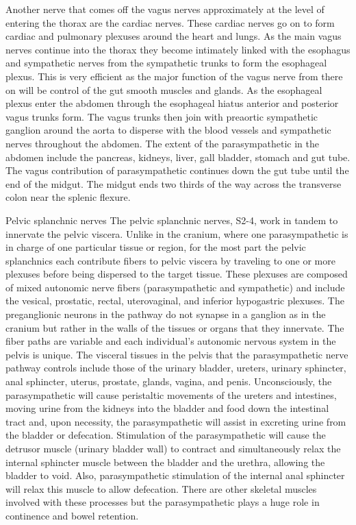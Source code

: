 \documentclass[]{book}
\begin{document}
Another nerve that comes off the vagus nerves approximately at the level of entering the thorax are the cardiac nerves. These cardiac nerves go on to form cardiac and pulmonary plexuses around the heart and lungs. As the main vagus nerves continue into the thorax they become intimately linked with the esophagus and sympathetic nerves from the sympathetic trunks to form the esophageal plexus. This is very efficient as the major function of the vagus nerve from there on will be control of the gut smooth muscles and glands. As the esophageal plexus enter the abdomen through the esophageal hiatus anterior and posterior vagus trunks form. The vagus trunks then join with preaortic sympathetic ganglion around the aorta to disperse with the blood vessels and sympathetic nerves throughout the abdomen. The extent of the parasympathetic in the abdomen include the pancreas, kidneys, liver, gall bladder, stomach and gut tube. The vagus contribution of parasympathetic continues down the gut tube until the end of the midgut. The midgut ends two thirds of the way across the transverse colon near the splenic flexure.

Pelvic splanchnic nerves
The pelvic splanchnic nerves, S2-4, work in tandem to innervate the pelvic viscera. Unlike in the cranium, where one parasympathetic is in charge of one particular tissue or region, for the most part the pelvic splanchnics each contribute fibers to pelvic viscera by traveling to one or more plexuses before being dispersed to the target tissue. These plexuses are composed of mixed autonomic nerve fibers (parasympathetic and sympathetic) and include the vesical, prostatic, rectal, uterovaginal, and inferior hypogastric plexuses. The preganglionic neurons in the pathway do not synapse in a ganglion as in the cranium but rather in the walls of the tissues or organs that they innervate. The fiber paths are variable and each individual's autonomic nervous system in the pelvis is unique. The visceral tissues in the pelvis that the parasympathetic nerve pathway controls include those of the urinary bladder, ureters, urinary sphincter, anal sphincter, uterus, prostate, glands, vagina, and penis. Unconsciously, the parasympathetic will cause peristaltic movements of the ureters and intestines, moving urine from the kidneys into the bladder and food down the intestinal tract and, upon necessity, the parasympathetic will assist in excreting urine from the bladder or defecation. Stimulation of the parasympathetic will cause the detrusor muscle (urinary bladder wall) to contract and simultaneously relax the internal sphincter muscle between the bladder and the urethra, allowing the bladder to void. Also, parasympathetic stimulation of the internal anal sphincter will relax this muscle to allow defecation. There are other skeletal muscles involved with these processes but the parasympathetic plays a huge role in continence and bowel retention.
\end{document}
